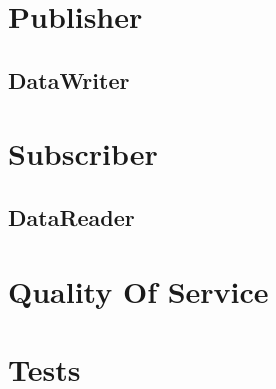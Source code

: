 \section{Publisher}
\subsection{DataWriter}

\section{Subscriber}
\subsection{DataReader}


\section{Quality Of Service}


\section{Tests}
